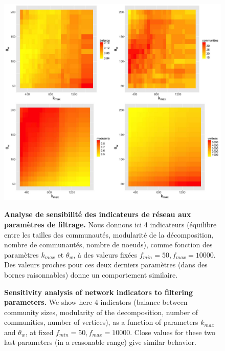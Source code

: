 


\begin{figure}
\includegraphics[width=\linewidth]{Figures/Final/B-cybergeo-fig6.jpg}
\caption{\textbf{Sensitivity analysis of network indicators to filtering parameters.} We show here 4 indicators (balance between community sizes, modularity of the decomposition, number of communities, number of vertices), as a function of parameters $k_{max}$ and $\theta_w$, at fixed $f_{min} = 50, f_{max} = 10000$. Close values for these two last parameters (in a reasonable range) give similar behavior.\label{fig:cybergeo:fig6}}{\textbf{Analyse de sensibilité des indicateurs de réseau aux paramètres de filtrage.} Nous donnons ici 4 indicateurs (équilibre entre les tailles des communautés, modularité de la décomposition, nombre de communautés, nombre de noeuds), comme fonction des paramètres $k_{max}$ et $\theta_w$, à des valeurs fixées $f_{min} = 50, f_{max} = 10000$. Des valeurs proches pour ces deux derniers paramètres (dans des bornes raisonnables) donne un comportement similaire.\label{fig:cybergeo:fig6}}
\end{figure}





